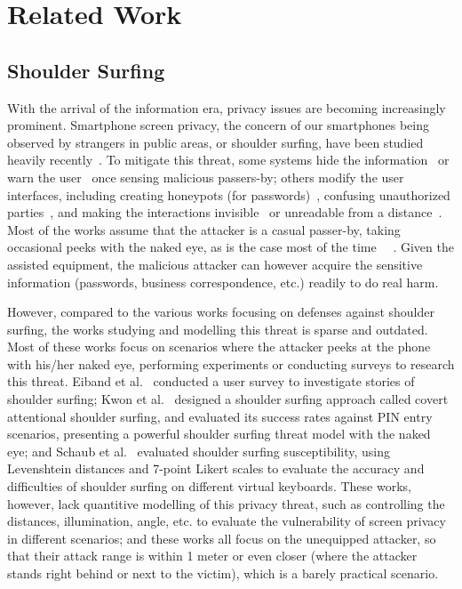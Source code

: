 \section{Related Work}
\label{sec-related-work}

\subsection{Shoulder Surfing}
With the arrival of the information era, privacy issues are becoming increasingly prominent. Smartphone screen privacy, the concern of our smartphones being observed by strangers in public areas, or shoulder surfing, have been studied heavily recently~\cite{eiband2017understanding,goucher2011look,kwon2013covert}. To mitigate this threat, some systems hide the information~\cite{brudy2014anyone} or warn the user~\cite{saad2018communicating} once sensing malicious passers-by; others modify the user interfaces, including creating honeypots (for passwords)~\cite{chakraborty2014tag}, confusing unauthorized parties~\cite{wiedenbeck2006design}, and making the interactions invisible~\cite{kumar2007reducing} or unreadable from a distance~\cite{Chun2019Keep}. Most of the works assume that the attacker is a casual passer-by, taking occasional peeks with the naked eye, as is the case most of the time~\cite{eiband2017understanding} ~\cite{wiedenbeck2006design}. Given the assisted equipment, the malicious attacker can however acquire the sensitive information (passwords, business correspondence, etc.) readily to do real harm.

However, compared to the various works focusing on defenses against shoulder surfing, the works studying and modelling this threat is sparse and outdated. Most of these works focus on scenarios where the attacker peeks at the phone with his/her naked eye, performing experiments or conducting surveys to research this threat. Eiband et al.~\cite{eiband2017understanding} conducted a user survey to investigate stories of shoulder surfing; Kwon et al.~\cite{kwon2013covert} designed a shoulder surfing approach called covert attentional shoulder surfing, and evaluated its success rates against PIN entry scenarios, presenting a powerful shoulder surfing threat model with the naked eye; and Schaub et al.~\cite{schaub2012password} evaluated shoulder surfing susceptibility, using Levenshtein distances and 7-point Likert scales to evaluate the accuracy and difficulties of shoulder surfing on different virtual keyboards. These works, however, lack quantitive modelling of this privacy threat, such as controlling the distances, illumination, angle, etc. to evaluate the vulnerability of screen privacy in different scenarios; and these works all focus on the unequipped attacker, so that their attack range is within 1 meter or even closer (where the attacker stands right behind or next to the victim), which is a barely practical scenario.

